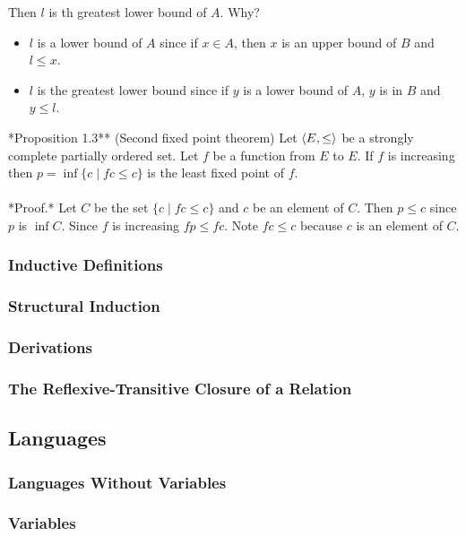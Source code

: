 Then $l$ is th greatest lower bound of $A$. Why?
\begin{itemize}
\item 
 $l$ is a lower bound of $A$ since if $x \in A$, then $x$ is an upper bound of $B$ and
 $l \leq x$.
\item $l$ is the greatest lower bound since if $y$ is a lower bound of $A$, 
$y$ is in $B$ and $y \leq l$.
\end{itemize}

\medskip

\noindent **Proposition 1.3** (Second fixed point theorem) Let $\langle E, \leq\rangle$ be a strongly
  complete partially ordered set.  Let $f$ be a function from $E$ to $E$. If
  $f$ is increasing then $p = \inf \{c \mid f c \leq c\}$ is the least fixed point
  of $f$.\\
\\
*Proof.* Let $C$ be the set $\{c \mid f c \leq c\}$ and $c$ be an element of $C$. Then
 $p \leq c$ since $p$ is $\inf C$. Since $f$ is increasing $f p \leq f c$. Note 
 $f c \leq c$ because $c$ is an element of $C$. 

\subsubsection{Inductive Definitions}
\subsubsection{Structural Induction}
\subsubsection{Derivations}
\subsubsection{The Reflexive-Transitive Closure of a Relation}


\subsection{Languages}

\subsubsection{Languages Without Variables}
\subsubsection{Variables}
